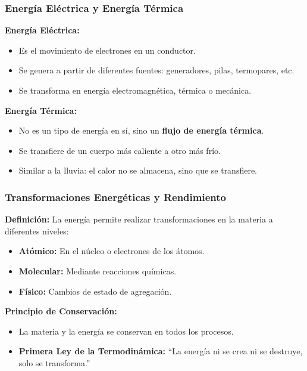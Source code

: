 \documentclass[main.tex]{subfiles}
\begin{document}
\begin{frame}
    \frametitle{Energía Eléctrica y Energía Térmica}

    \textbf{Energía Eléctrica:}  
    \begin{itemize}
        \item Es el movimiento de electrones en un conductor.
        \item Se genera a partir de diferentes fuentes: generadores, pilas, termopares, etc.
        \item Se transforma en energía electromagnética, térmica o mecánica.
    \end{itemize}

    \vspace{0.3cm}
    \textbf{Energía Térmica:}  
    \begin{itemize}
        \item No es un tipo de energía en sí, sino un \textbf{flujo de energía térmica}.
        \item Se transfiere de un cuerpo más caliente a otro más frío.
        \item Similar a la lluvia: el calor no se almacena, sino que se transfiere.
    \end{itemize}

\end{frame}

\begin{frame}
    \frametitle{Transformaciones Energéticas y Rendimiento}

    \textbf{Definición:}  
    La energía permite realizar transformaciones en la materia a diferentes niveles:
    \begin{itemize}
        \item \textbf{Atómico:} En el núcleo o electrones de los átomos.
        \item \textbf{Molecular:} Mediante reacciones químicas.
        \item \textbf{Físico:} Cambios de estado de agregación.
    \end{itemize}

    \vspace{0.3cm}
    \textbf{Principio de Conservación:}
    \begin{itemize}
        \item La materia y la energía se conservan en todos los procesos.
        \item \textbf{Primera Ley de la Termodinámica:} ``La energía ni se crea ni se destruye, solo se transforma.''
    \end{itemize}

\end{frame}
\end{document}
